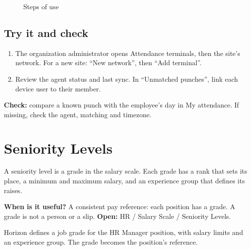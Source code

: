 \begin{figure}[H]
\centering
{}
\rclegend
\caption{Steps of use}
\label{fig:hr-feature-attendance-terminals-flow}
\end{figure}

\subsection{Try it and check}

\begin{enumerate}
  \item The organization administrator opens Attendance terminals, then the site's network. For a new site: “New network”, then “Add terminal”.
  \item Review the agent status and last sync. In “Unmatched punches”, link each device user to their member.
\end{enumerate}

\textbf{Check:} compare a known punch with the employee's day in My attendance. If missing, check the agent, matching and timezone.

\clearpage
\section{Seniority Levels}
\label{sec:hr-feature-seniority-levels}

A seniority level is a grade in the salary scale. Each grade has a rank that sets its place, a minimum and maximum salary, and an experience group that defines its raises.

\textbf{When is it useful?} A consistent pay reference: each position has a grade. A grade is not a person or a slip. \textbf{Open:} HR / Salary Scale / Seniority Levels.

\begin{rcnote}
Horizon defines a job grade for the HR Manager position, with salary limits and an experience group. The grade becomes the position’s reference.
\end{rcnote}

